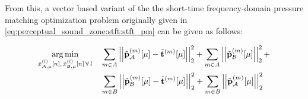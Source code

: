 From this, a vector based variant of the the short-time frequency-domain pressure matching optimization problem 
originally given in \autoref{eq:perceptual_sound_zone:stft:stft_pm} can be given as follows:

\begin{align}
    \begin{aligned}
    \argmin{\tilde{x}_{\za,\mu}^{(l)}[n],\,\tilde{x}_{\zb,\mu}^{(l)}[n]\,\forall\,l}{
       &\sum_{m\in A} \norm[2][2]{\tilde{\vec{p}}_{\za}^{(m)}[\mu] - \tilde{\vec{t}}^{(m)}[\mu]} +
        \sum_{m\in A} \norm[2][2]{\tilde{\vec{p}}_{\zb}^{(m)}[\mu]} + \\
       &\sum_{m\in B} \norm[2][2]{\tilde{\vec{p}}_{\zb}^{(m)}[\mu] - \tilde{\vec{t}}^{(m)}[\mu]} + 
        \sum_{m\in B} \norm[2][2]{\tilde{\vec{p}}_{\za}^{(m)}[\mu]}
    }
    \end{aligned}
    \label{eq:perceptual_sound_zone:stft:stft_pm_vec}
\end{align}
